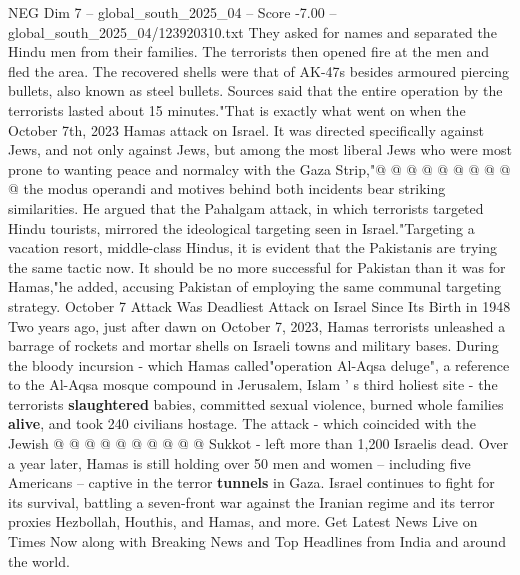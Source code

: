 \begin{textsample}{NEG Dim 7 – global\_south\_2025\_04 – Score -7.00 – global\_south\_2025\_04/123920310.txt}
They asked for names and separated the Hindu men from their families.
The terrorists then opened fire at the men and fled the area.
The recovered shells were that of AK-47s besides armoured piercing bullets, also known as steel bullets.
Sources said that the entire operation by the terrorists lasted about 15 minutes."That is exactly what went on when the October 7th, 2023 Hamas attack on Israel.
It was directed specifically against Jews, and not only against Jews, but among the most liberal Jews who were most prone to wanting peace and normalcy with the Gaza Strip,"@ @ @ @ @ @ @ @ @ @ the modus operandi and motives behind both incidents bear striking similarities.
He argued that the Pahalgam attack, in which terrorists targeted Hindu tourists, mirrored the ideological targeting seen in Israel."Targeting a vacation resort, middle-class Hindus, it is evident that the Pakistanis are trying the same tactic now.
It should be no more successful for Pakistan than it was for Hamas,"he added, accusing Pakistan of employing the same communal targeting strategy.
October 7 Attack Was Deadliest Attack on Israel Since Its Birth in 1948 Two years ago, just after dawn on October 7, 2023, Hamas terrorists unleashed a barrage of rockets and mortar shells on Israeli towns and military bases.
During the bloody incursion - which Hamas called"operation Al-Aqsa deluge", a reference to the Al-Aqsa mosque compound in Jerusalem, Islam ' s third holiest site - the terrorists \textbf{slaughtered} babies, committed sexual violence, burned whole families \textbf{alive}, and took 240 civilians hostage.
The attack - which coincided with the Jewish @ @ @ @ @ @ @ @ @ @ Sukkot - left more than 1,200 Israelis dead.
Over a year later, Hamas is still holding over 50 men and women -- including five Americans -- captive in the terror \textbf{tunnels} in Gaza.
Israel continues to fight for its survival, battling a seven-front war against the Iranian regime and its terror proxies Hezbollah, Houthis, and Hamas, and more.
Get Latest News Live on Times Now along with Breaking News and Top Headlines from India and around the world.

\end{textsample}
